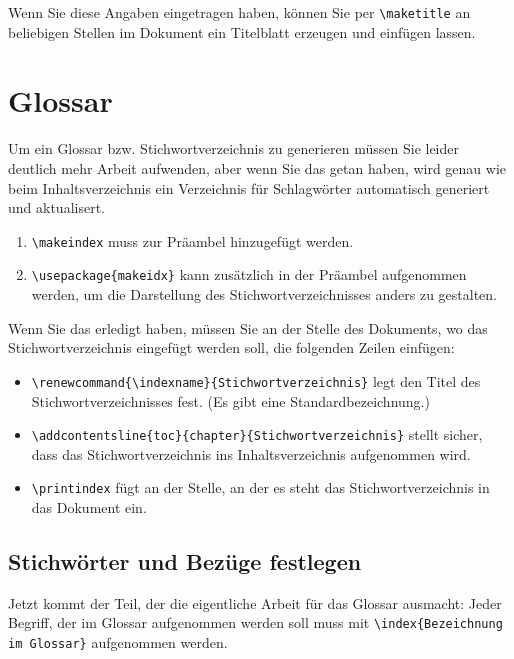 Wenn Sie diese Angaben eingetragen haben, können Sie per \verb|\maketitle| an beliebigen Stellen im Dokument ein Titelblatt erzeugen und einfügen lassen.

\section{Glossar}

Um ein Glossar bzw. Stichwortverzeichnis zu generieren müssen Sie leider deutlich mehr Arbeit aufwenden, aber wenn Sie das getan haben, wird genau wie beim Inhaltsverzeichnis ein Verzeichnis für Schlagwörter automatisch generiert und aktualisert.\\

\begin{enumerate}
	\item \verb|\makeindex| muss zur Präambel hinzugefügt werden.
	\item \verb|\usepackage{makeidx}| kann zusätzlich in der Präambel aufgenommen werden, um die Darstellung des Stichwortverzeichnisses anders zu gestalten.
\end{enumerate}

Wenn Sie das erledigt haben, müssen Sie an der Stelle des Dokuments, wo das Stichwortverzeichnis eingefügt werden soll, die folgenden Zeilen einfügen:

\begin{itemize}
	\item \verb|\renewcommand{\indexname}{Stichwortverzeichnis}| legt den Titel des Stichwortverzeichnisses fest. (Es gibt eine Standardbezeichnung.)
	\item \verb|\addcontentsline{toc}{chapter}{Stichwortverzeichnis}| stellt sicher, dass das Stichwortverzeichnis ins Inhaltsverzeichnis aufgenommen wird.
	\item \verb|\printindex| fügt an der Stelle, an der es steht das Stichwortverzeichnis in das Dokument ein.
\end{itemize}

\subsection{Stichwörter und Bezüge festlegen}

Jetzt kommt der Teil, der die eigentliche Arbeit für das Glossar ausmacht: Jeder Begriff, der im Glossar aufgenommen werden soll muss mit \verb|\index{Bezeichnung im Glossar}| aufgenommen werden.\\

